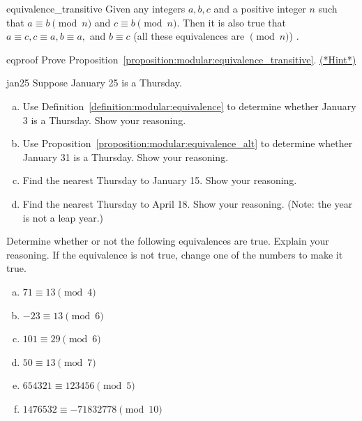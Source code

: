 \begin{prop}{equivalence_transitive}
Given any integers $a, b, c$ and a positive integer $n$ such that $a \equiv b \pmod{n}$ and $c \equiv b \pmod{n}$. Then it is also true that $a \equiv c, c \equiv a, b \equiv a,$ and $ b \equiv c$ (all these equivalences are $\pmod{n}$) .
\end{prop}
\begin{exercise}{eqproof}
Prove Proposition~\ref{proposition:modular:equivalence_transitive}. 
\hyperref[sec:modular_arithmetic:hints]{(*Hint*)}
\end{exercise}

\begin{exercise}{jan25}
Suppose January 25 is a Thursday. 
\begin{enumerate}[(a)]
\item
Use Definition~\ref{definition:modular:equivalence} to determine whether January 3 is a Thursday. Show your reasoning.
\item
Use Proposition~\ref{proposition:modular:equivalence_alt} to determine whether January 31 is a Thursday. Show your reasoning.
\item
Find the nearest Thursday to January 15. Show your reasoning.
\item
Find the nearest Thursday to April 18. Show your reasoning.  (Note: the year is not a leap year.)
\end{enumerate}
\end{exercise}

\begin{exercise}{22}
Determine whether or not the following equivalences are true. Explain your reasoning. If the equivalence is not true, change one of the numbers to make it true.
\begin{multicols}{2}
\begin{enumerate}[(a)]
 
\item
$71 \equiv 13 \pmod{4}$
 
 \item
 $-23 \equiv 13 \pmod{6}$

\item
$101 \equiv 29 \pmod{6}$

\item
$50 \equiv 13 \pmod{7}$

 \item
$654321 \equiv 123456  \pmod{5}$

 \item
$1476532 \equiv -71832778  \pmod{10}$
\end{enumerate}
\end{multicols}
\end{exercise}


